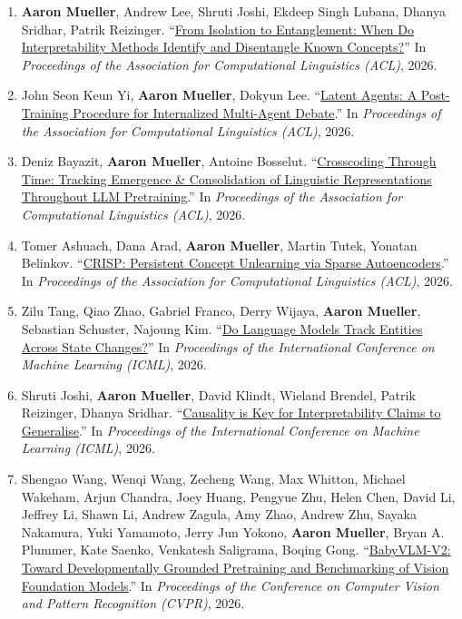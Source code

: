 \documentclass[10pt]{article}
\providecommand*\titlelink[2]{\href{#1}{\textcolor{accent}{#2}}}
\begin{document}
\begin{enumerate}[leftmargin=*, topsep=0pt, itemsep=0.25ex, partopsep=0ex, parsep=1ex, label=C\arabic*., ref=C\arabic*]
	\item \textbf{Aaron Mueller}, Andrew Lee, Shruti Joshi, Ekdeep Singh Lubana, Dhanya Sridhar, Patrik Reizinger. ``\titlelink{https://arxiv.org/abs/2512.15134}{From Isolation to Entanglement: When Do Interpretability Methods Identify and Disentangle Known Concepts?}'' In \emph{Proceedings of the Association for Computational Linguistics (ACL)}, 2026.
	
	\item John Seon Keun Yi, \textbf{Aaron Mueller}, Dokyun Lee. ``\titlelink{https://arxiv.org/abs/2604.24881}{Latent Agents: A Post-Training Procedure for Internalized Multi-Agent Debate}.'' In \emph{Proceedings of the Association for Computational Linguistics (ACL)}, 2026.

	\item Deniz Bayazit, \textbf{Aaron Mueller}, Antoine Bosselut. ``\titlelink{https://arxiv.org/abs/2509.05291v1}{Crosscoding Through Time: Tracking Emergence \& Consolidation of Linguistic Representations Throughout LLM Pretraining}.'' In \emph{Proceedings of the Association for Computational Linguistics (ACL)}, 2026.

	\item Tomer Ashuach, Dana Arad, \textbf{Aaron Mueller}, Martin Tutek, Yonatan Belinkov. ``\titlelink{https://arxiv.org/abs/2508.13650}{CRISP: Persistent Concept Unlearning via Sparse Autoencoders}.'' In \emph{Proceedings of the Association for Computational Linguistics (ACL)}, 2026.
	
	\item Zilu Tang, Qiao Zhao, Gabriel Franco, Derry Wijaya, \textbf{Aaron Mueller}, Sebastian Schuster, Najoung Kim. ``\titlelink{https://icml.cc/virtual/2026/poster/64207}{Do Language Models Track Entities Across State Changes?}'' In \emph{Proceedings of the International Conference on Machine Learning (ICML)}, 2026.

	\item Shruti Joshi, \textbf{Aaron Mueller}, David Klindt, Wieland Brendel, Patrik Reizinger, Dhanya Sridhar. ``\titlelink{https://arxiv.org/abs/2602.16698}{Causality is Key for Interpretability Claims to Generalise}.'' In \emph{Proceedings of the International Conference on Machine Learning (ICML)}, 2026.
	
	\item Shengao Wang, Wenqi Wang, Zecheng Wang, Max Whitton, Michael Wakeham, Arjun Chandra, Joey Huang, Pengyue Zhu, Helen Chen, David Li, Jeffrey Li, Shawn Li, Andrew Zagula, Amy Zhao, Andrew Zhu, Sayaka Nakamura, Yuki Yamamoto, Jerry Jun Yokono, \textbf{Aaron Mueller}, Bryan A. Plummer, Kate Saenko, Venkatesh Saligrama, Boqing Gong. ``\titlelink{https://arxiv.org/abs/2512.10932}{BabyVLM-V2: Toward Developmentally Grounded Pretraining and Benchmarking of Vision Foundation Models}.'' In \emph{Proceedings of the Conference on Computer Vision and Pattern Recognition (CVPR)}, 2026.
	

\end{enumerate}
\end{document}
